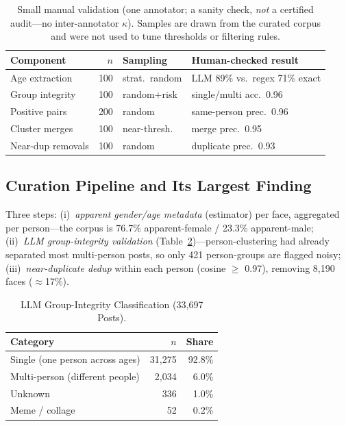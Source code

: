 \documentclass[journal]{IEEEtran}
\begin{document}
\begin{table}[!t]
\renewcommand{\arraystretch}{1.15}
\caption{Small manual validation (one annotator; a sanity check, \emph{not} a certified audit---no inter-annotator $\kappa$). Samples are drawn from the curated corpus and were not used to tune thresholds or filtering rules.}
\label{tab:humanval}
\centering
\footnotesize
\setlength{\tabcolsep}{3.5pt}
\begin{tabular}{@{}lrll@{}}
\toprule
Component & $n$ & Sampling & Human-checked result \\
\midrule
Age extraction & 100 & strat.\ random & LLM 89\% vs.\ regex 71\% exact \\
Group integrity & 100 & random$+$risk & single/multi acc.\ 0.96 \\
Positive pairs & 200 & random & same-person prec.\ 0.96 \\
Cluster merges & 100 & near-thresh. & merge prec.\ 0.95 \\
Near-dup removals & 100 & random & duplicate prec.\ 0.93 \\
\bottomrule
\end{tabular}
\end{table}

\subsection{Curation Pipeline and Its Largest Finding}\label{sec:data-curation}
Three steps: (i)~\emph{apparent gender/age metadata} (estimator) per face, aggregated per person---the corpus is 76.7\% apparent-female / 23.3\% apparent-male; (ii)~\emph{LLM group-integrity validation} (Table~\ref{tab:integrity})---person-clustering had already separated most multi-person posts, so only 421 person-groups are flagged noisy; (iii)~\emph{near-duplicate dedup} within each person (cosine $\geq$ 0.97), removing 8{,}190 faces ($\approx$17\%).

\begin{table}[!t]
\renewcommand{\arraystretch}{1.2}
\caption{LLM Group-Integrity Classification (33{,}697 Posts).}
\label{tab:integrity}
\centering
\footnotesize
\begin{tabular}{@{}lrr@{}}
\toprule
Category & $n$ & Share \\
\midrule
Single (one person across ages) & 31{,}275 & 92.8\% \\
Multi-person (different people) & 2{,}034 & 6.0\% \\
Unknown & 336 & 1.0\% \\
Meme / collage & 52 & 0.2\% \\
\bottomrule
\end{tabular}
\end{table}
\end{document}
